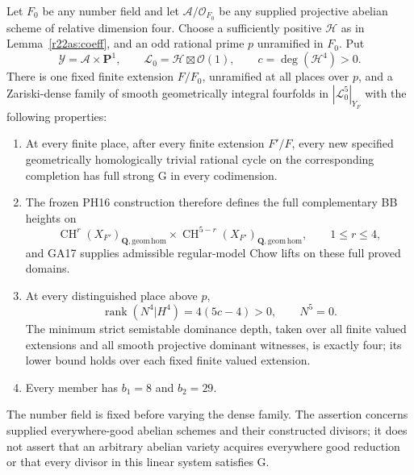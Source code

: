 \begin{theorem}
\label{r22as:global}
Let $F_0$ be any number field and let
$\mathcal A/\mathcal O_{F_0}$ be any supplied
projective abelian scheme of relative dimension four.
Choose a sufficiently positive $\mathcal H$ as in
Lemma~\ref{r22as:coeff}, and an odd rational prime
$p$ unramified in $F_0$.  Put
\[
 \mathcal Y=\mathcal A\times\mathbf P^1,\qquad
 \mathcal L_0=\mathcal H\boxtimes\mathcal O(1),\qquad
                          c=\deg(\mathcal H^4)>0.
 \tag{AS22.6}\label{r22as:globaldatum}
\]
There is one fixed finite extension $F/F_0$,
unramified at all places over $p$, and a
Zariski-dense family of smooth geometrically
integral fourfolds in $|\mathcal L_0^5|_{Y_F}$
with the following properties:
\begin{enumerate}
\item At every finite place, after every finite
extension $F'/F$, every new specified geometrically
homologically trivial rational cycle on the
corresponding completion has full strong G in
every codimension.
\item The frozen PH16 construction therefore
defines the full complementary BB heights on
\[
 \operatorname{CH}^r(X_{F'})_{\mathbf Q,\mathrm{geom\,hom}}
 \times
 \operatorname{CH}^{5-r}(X_{F'})_{\mathbf Q,\mathrm{geom\,hom}},
                      \qquad1\le r\le4,
 \tag{AS22.7}\label{r22as:heights}
\]
and GA17 supplies admissible regular-model Chow
lifts on these full proved domains.
\item At every distinguished place above $p$,
\[
        \operatorname{rank}(N^4|H^4)=4(5c-4)>0,
                       \qquad N^5=0.
 \tag{AS22.8}\label{r22as:N4}
\]
The minimum strict semistable dominance depth,
taken over all finite valued extensions and all
smooth projective dominant witnesses, is exactly
four; its lower bound holds over each fixed
finite valued extension.
\item Every member has $b_1=8$ and $b_2=29$.
\end{enumerate}
The number field is fixed before varying the
dense family.  The assertion concerns supplied
everywhere-good abelian schemes and their
constructed divisors; it does not assert that
an arbitrary abelian variety acquires everywhere
good reduction or that every divisor in this
linear system satisfies G.
\end{theorem}

